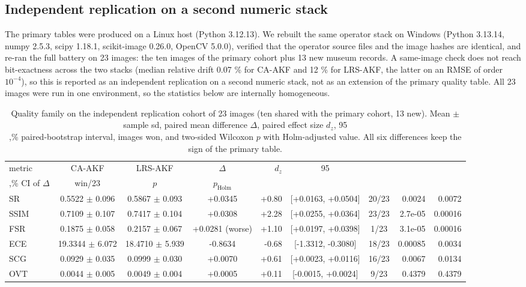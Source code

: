 \documentclass[journal]{IEEEtran}
\begin{document}
\subsection{Independent replication on a second numeric stack}\label{sec:replication}

The primary tables were produced on a Linux host (Python 3.12.13). We rebuilt the same operator stack on Windows (Python 3.13.14, numpy 2.5.3, scipy 1.18.1, scikit-image 0.26.0, OpenCV 5.0.0), verified that the operator source files and the image hashes are identical, and re-ran the full battery on 23 images: the ten images of the primary cohort plus 13 new museum records. A same-image check does not reach bit-exactness across the two stacks (median relative drift 0.07 \% for CA-AKF and 12 \% for LRS-AKF, the latter on an RMSE of order \(10^{-4}\)), so this is reported as an independent replication on a second numeric stack, not as an extension of the primary quality table. All 23 images were run in one environment, so the statistics below are internally homogeneous.

\begin{table}[t]
\caption{Quality family on the independent replication cohort of 23 images (ten shared with the primary cohort, 13 new). Mean $\pm$ sample sd, paired mean difference $\Delta$, paired effect size $d_z$, 95\\,\% paired-bootstrap interval, images won, and two-sided Wilcoxon $p$ with Holm-adjusted value. All six differences keep the sign of the primary table.}
\label{tab:replication}
\centering
\footnotesize
\begin{tabular}{@{}lcccrccrr@{}}
\toprule
metric & CA-AKF & LRS-AKF & $\Delta$ & $d_z$ & 95\\,\% CI of $\Delta$ & win/23 & $p$ & $p_{\mathrm{Holm}}$ \\
\midrule
SR & 0.5522 $\pm$ 0.096 & 0.5867 $\pm$ 0.093 & +0.0345 & +0.80 & [+0.0163, +0.0504] & 20/23 & 0.0024 & 0.0072 \\
SSIM & 0.7109 $\pm$ 0.107 & 0.7417 $\pm$ 0.104 & +0.0308 & +2.28 & [+0.0255, +0.0364] & 23/23 & 2.7e-05 & 0.00016 \\
FSR & 0.1875 $\pm$ 0.058 & 0.2157 $\pm$ 0.067 & +0.0281 (worse) & +1.10 & [+0.0197, +0.0398] & 1/23 & 3.1e-05 & 0.00016 \\
ECE & 19.3344 $\pm$ 6.072 & 18.4710 $\pm$ 5.939 & -0.8634 & -0.68 & [-1.3312, -0.3080] & 18/23 & 0.00085 & 0.0034 \\
SCG & 0.0929 $\pm$ 0.035 & 0.0999 $\pm$ 0.030 & +0.0070 & +0.61 & [+0.0023, +0.0116] & 16/23 & 0.0067 & 0.0134 \\
OVT & 0.0044 $\pm$ 0.005 & 0.0049 $\pm$ 0.004 & +0.0005 & +0.11 & [-0.0015, +0.0024] & 9/23 & 0.4379 & 0.4379 \\
\bottomrule
\end{tabular}
\end{table}
\end{document}

